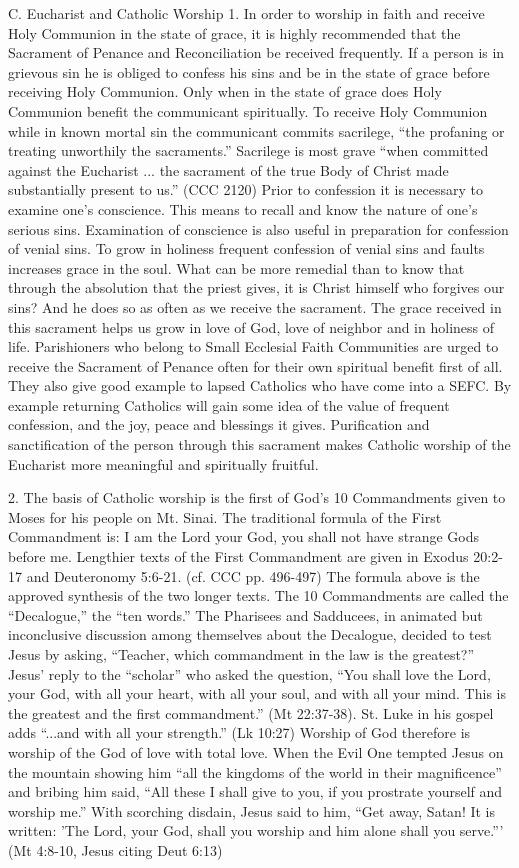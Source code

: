 \documentclass[oneside]{book}
\begin{document}
C. Eucharist and Catholic Worship
1. In order to worship in faith and receive Holy Communion in the state of
grace, it is highly recommended that the Sacrament of Penance and Reconciliation
be received frequently. If a person is in grievous sin he is obliged to confess
his sins and be in the state of grace before receiving Holy Communion. Only when
in the state of grace does Holy Communion benefit the communicant
spiritually. To receive Holy Communion while in known mortal sin the communicant
commits sacrilege, ``the profaning or treating unworthily the sacraments.''
Sacrilege is most grave ``when committed against the Eucharist ... the sacrament
of the true Body of Christ made substantially present to us.'' (CCC 2120)
Prior to confession it is necessary to examine one's conscience. This means to
recall and know the nature of one's serious sins. Examination of conscience is
also useful in preparation for confession of venial sins. To grow in holiness
frequent confession of venial sins and faults increases grace in the soul. What
can be more remedial than to know that through the absolution that the priest
gives, it is Christ himself who forgives our sins? And he does so as often as we
receive the sacrament. The grace received in this sacrament helps us grow in
love of God, love of neighbor and in holiness of life. Parishioners who belong
to Small Ecclesial Faith Communities are urged to receive the Sacrament of
Penance often for their own spiritual benefit first of all. They also give good
example to lapsed Catholics who have come into a SEFC. By example returning
Catholics will gain some idea of the value of frequent confession, and the joy,
peace and blessings it gives. Purification and sanctification of the person
through this sacrament makes Catholic worship of the Eucharist more meaningful
and spiritually fruitful.

2. The basis of Catholic worship is the first of God's 10 Commandments given to
Moses for his people on Mt. Sinai. The traditional formula of the First
Commandment is: I am the Lord your God, you shall not have strange Gods before
me. Lengthier texts of the First Commandment are given in Exodus 20:2-17 and
Deuteronomy 5:6-21. (cf. CCC pp. 496-497) The formula above is the approved
synthesis of the two longer texts. The 10 Commandments are called the
``Decalogue,'' the ``ten words.'' The Pharisees and Sadducees, in animated but
inconclusive discussion among themselves about the Decalogue, decided to test
Jesus by asking, ``Teacher, which commandment in the law is the greatest?''
Jesus' reply to the ``scholar'' who asked the question, ``You shall love the
Lord, your God, with all your heart, with all your soul, and with all your
mind. This is the greatest and the first commandment.'' (Mt 22:37-38). St. Luke
in his gospel adds ``...and with all your strength.'' (Lk 10:27) Worship of God
therefore is worship of the God of love with total love.
When the Evil One tempted Jesus on the mountain showing him ``all the kingdoms
of the world in their magnificence'' and bribing him said, ``All these I shall
give to you, if you prostrate yourself and worship me.'' With scorching disdain,
Jesus said to him, ``Get away, Satan! It is written: 'The Lord, your God, shall
you worship and him alone shall you serve.''' (Mt 4:8-10, Jesus citing Deut 6:13)
\end{document}
